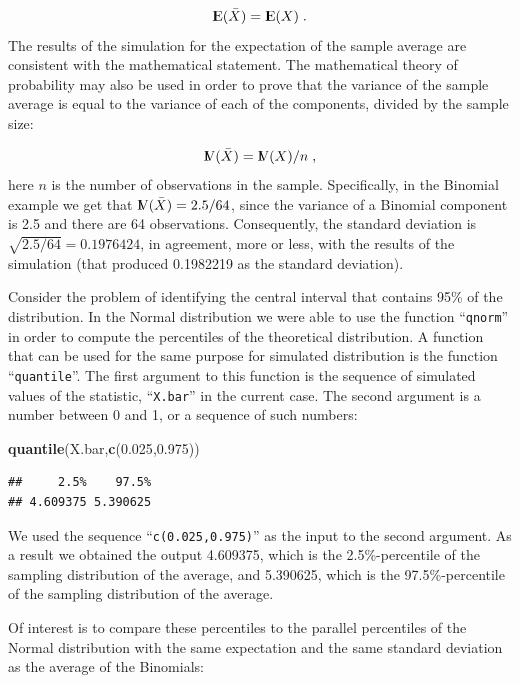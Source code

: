 \documentclass[]{krantz}
\makeatletter
\newenvironment{Shaded}{\begin{snugshade}}{\end{snugshade}}
\newcommand{\FloatTok}[1]{\textcolor[rgb]{0.00,0.00,0.81}{#1}}
\newcommand{\KeywordTok}[1]{\textcolor[rgb]{0.13,0.29,0.53}{\textbf{#1}}}
\newcommand{\NormalTok}[1]{#1}
\newcommand{\Expec}{{\rm I\kern-.3em E}}
\newcommand{\Var}{{\rm I\kern-.3em V}}
\newenvironment{kframe}{%
\medskip{}
\setlength{\fboxsep}{.8em}
 \def\at@end@of@kframe{}%
 \ifinner\ifhmode%
  \def\at@end@of@kframe{\end{minipage}}%
  \begin{minipage}{\columnwidth}%
 \fi\fi%
 \def\FrameCommand##1{\hskip\@totalleftmargin \hskip-\fboxsep
 \colorbox{shadecolor}{##1}\hskip-\fboxsep
     \hskip-\linewidth \hskip-\@totalleftmargin \hskip\columnwidth}%
 \MakeFramed {\advance\hsize-\width
   \@totalleftmargin\z@ \linewidth\hsize
   \@setminipage}}%
 {\par\unskip\endMakeFramed%
 \at@end@of@kframe}
\renewenvironment{Shaded}{\begin{kframe}}{\end{kframe}}
\theoremstyle{definition}
\theoremstyle{definition}
\theoremstyle{definition}
\theoremstyle{remark}
\makeatother
\begin{document}
\[\Expec(\bar X) = \Expec(X)\;.\] The results of the simulation for the
expectation of the sample average are consistent with the mathematical
statement. The mathematical theory of probability may also be used in
order to prove that the variance of the sample average is equal to the
variance of each of the components, divided by the sample size:

\[\Var(\bar X) = \Var(X)/n\;,\] here \(n\) is the number of observations
in the sample. Specifically, in the Binomial example we get that
\(\Var(\bar X) = 2.5/64\), since the variance of a Binomial component is
2.5 and there are 64 observations. Consequently, the standard deviation
is \(\sqrt{2.5/64} = 0.1976424\), in agreement, more or less, with the
results of the simulation (that produced 0.1982219 as the standard
deviation).

Consider the problem of identifying the central interval that contains
95\% of the distribution. In the Normal distribution we were able to use
the function ``\texttt{qnorm}'' in order to compute the percentiles of the
theoretical distribution. A function that can be used for the same
purpose for simulated distribution is the function ``\texttt{quantile}''. The
first argument to this function is the sequence of simulated values of
the statistic, ``\texttt{X.bar}'' in the current case. The second argument is a
number between 0 and 1, or a sequence of such numbers:

\begin{Shaded}
\begin{Highlighting}[]
\KeywordTok{quantile}\NormalTok{(X.bar,}\KeywordTok{c}\NormalTok{(}\FloatTok{0.025}\NormalTok{,}\FloatTok{0.975}\NormalTok{))}
\end{Highlighting}
\end{Shaded}

\begin{verbatim}
##     2.5%    97.5% 
## 4.609375 5.390625
\end{verbatim}

We used the sequence ``\texttt{c(0.025,0.975)}'' as the input to the second
argument. As a result we obtained the output 4.609375, which is the
2.5\%-percentile of the sampling distribution of the average, and
5.390625, which is the 97.5\%-percentile of the sampling distribution of
the average.

Of interest is to compare these percentiles to the parallel percentiles
of the Normal distribution with the same expectation and the same
standard deviation as the average of the Binomials:
\end{document}
